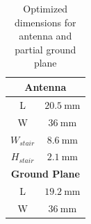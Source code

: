 \documentclass[a4paper]{article}        %
\begin{document}
	\begin{table}[H]
	\centering
	\begin{tabular}{|c|c|}
		\hline
		\multicolumn{2}{|c|}{\textbf{Antenna}} \\ \hline
		L & $\SI{20.5}{\milli\meter}$ \\ \hline
		W & $\SI{36}{\milli\meter}$ \\ \hline
		$W_{stair}$ & $\SI{8.6}{\milli\meter}$ \\ \hline
		$H_{stair}$ & $\SI{2.1}{\milli\meter}$ \\ \hline
		\multicolumn{2}{|c|}{\textbf{Ground Plane}} \\ \hline
		L & $\SI{19.2}{\milli\meter}$ \\ \hline
		W & $\SI{36}{\milli\meter}$ \\ \hline 
	\end{tabular}
	\caption{Optimized dimensions for antenna and partial ground plane}
	\label{tab:dimensions}
	\end{table}
\end{document}
